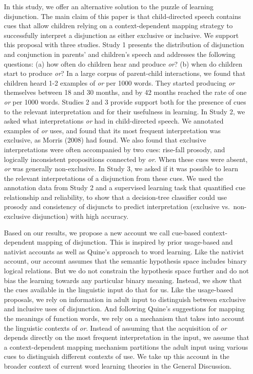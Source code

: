 \documentclass[
  ,man,floatsintext]{apa6}
\begin{document}
In this study, we offer an alternative solution to the puzzle of learning disjunction. The main claim of this paper is that child-directed speech contains cues that allow children relying on a context-dependent mapping strategy to successfully interpret a disjunction as either exclusive or inclusive. We support this proposal with three studies. Study 1 presents the distribution of disjunction and conjunction in parents' and children's speech and addresses the following questions: (a) how often do children hear and produce \emph{or}? (b) when do children start to produce \emph{or}? In a large corpus of parent-child interactions, we found that children heard 1-2 examples of \emph{or} per 1000 words. They started producing \emph{or} themselves between 18 and 30 months, and by 42 months reached the rate of one \emph{or} per 1000 words. Studies 2 and 3 provide support both for the presence of cues to the relevant interpretation and for their usefulness in learning. In Study 2, we asked what interpretations \emph{or} had in child-directed speech. We annotated examples of \emph{or} uses, and found that its most frequent interpretation was exclusive, as Morris (2008) had found. We also found that exclusive interpretations were often accompanied by two cues: rise-fall prosody, and logically inconsistent propositions connected by \emph{or}. When these cues were absent, \emph{or} was generally non-exclusive. In Study 3, we asked if it was possible to learn the relevant interpretations of a disjunction from these cues. We used the annotation data from Study 2 and a supervised learning task that quantified cue relationship and reliability, to show that a decision-tree classifier could use prosody and consistency of disjuncts to predict interpretation (exclusive vs.~non-exclusive disjunction) with high accuracy.

Based on our results, we propose a new account we call cue-based context-dependent mapping of disjunction. This is inspired by prior usage-based and nativist accounts as well as Quine's approach to word learning. Like the nativist account, our account assumes that the semantic hypothesis space includes binary logical relations. But we do not constrain the hypothesis space further and do not bias the learning towards any particular binary meaning. Instead, we show that the cues available in the linguistic input do that for us. Like the usage-based proposals, we rely on information in adult input to distinguish between exclusive and inclusive uses of disjunction. And following Quine's suggestions for mapping the meanings of function words, we rely on a mechanism that takes into account the linguistic contexts of \emph{or}. Instead of assuming that the acquisition of \emph{or} depends directly on the most frequent interpretation in the input, we assume that a context-dependent mapping mechanism partitions the adult input using various cues to distinguish different contexts of use. We take up this account in the broader context of current word learning theories in the General Discussion.
\end{document}
